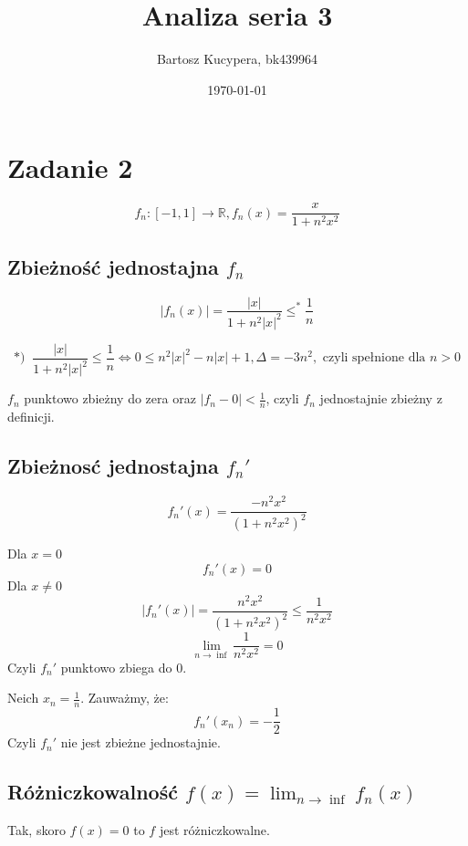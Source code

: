 \documentclass{article}
\title{Analiza seria 3}
\author{Bartosz Kucypera, bk439964}
\date{\today}
\begin{document}
\maketitle

\section*{Zadanie 2}
$$f_n:[-1, 1] \to \mathbb{R}, f_n(x) = \frac{x}{1+n^2x^2}$$

\subsection*{Zbieżność jednostajna $f_n$}
$$ |f_n(x)| = \frac{|x|}{1+n^2|x|^2} \le^* \frac{1}{n}$$

$$*) \; \; \frac{|x|}{1+n^2|x|^2} \le \frac{1}{n} \Leftrightarrow 0 \le n^2|x|^2 - n|x| + 1, 
\Delta = -3n^2, \mbox{ czyli spełnione dla } n > 0 $$

$f_n$ punktowo zbieżny do zera oraz $|f_n - 0| < \frac{1}{n}$, czyli $f_n$ jednostajnie zbieżny z definicji.

\subsection*{Zbieżnosć jednostajna $f_n'$}

$$f_n'(x) = \frac{-n^2x^2}{(1+n^2x^2)^2} $$

Dla $x = 0$
$$f_n'(x) = 0$$
Dla $x \ne 0$
$$|f_n'(x)| = \frac{n^2x^2}{(1+n^2x^2)^2} \le \frac{1}{n^2x^2}$$
$$\displaystyle \lim_{n \to \inf } \frac{1}{n^2x^2} = 0 $$
Czyli $f_n'$ punktowo zbiega do 0. \newline \newline

Neich $x_n = \frac{1}{n}$. Zauważmy, że:
$$ f_n'(x_n) = -\frac{1}{2} $$
Czyli $f_n'$ nie jest zbieżne jednostajnie.

\subsection*{Różniczkowalność $f(x) = \displaystyle \lim_{n \to \inf} f_n(x)$}
Tak, skoro $f(x) = 0$ to $f$ jest różniczkowalne.
\end{document}
